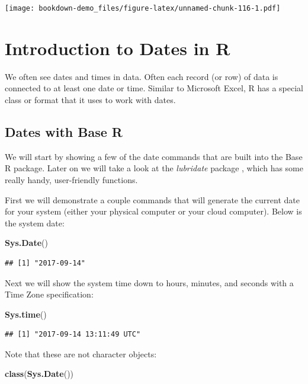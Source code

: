 \documentclass[]{book}
\newenvironment{Shaded}{\begin{snugshade}}{\end{snugshade}}
\newcommand{\KeywordTok}[1]{\textcolor[rgb]{0.13,0.29,0.53}{\textbf{{#1}}}}
\newcommand{\NormalTok}[1]{{#1}}
\begin{document}
\texttt{[image: bookdown-demo\_files/figure-latex/unnamed-chunk-116-1.pdf]}

\chapter{Introduction to Dates in R}\label{introduction-to-dates-in-r}

We often see dates and times in data. Often each record (or row) of data
is connected to at least one date or time. Similar to Microsoft Excel, R
has a special class or format that it uses to work with dates.

\section{Dates with Base R}\label{dates-with-base-r}

We will start by showing a few of the date commands that are built into
the Base R package. Later on we will take a look at the \emph{lubridate}
package \citep{R-lubridate}, which has some really handy, user-friendly
functions.

First we will demonstrate a couple commands that will generate the
current date for your system (either your physical computer or your
cloud computer). Below is the system date:

\begin{Shaded}
\begin{Highlighting}[]
\KeywordTok{Sys.Date}\NormalTok{()}
\end{Highlighting}
\end{Shaded}

\begin{verbatim}
## [1] "2017-09-14"
\end{verbatim}

Next we will show the system time down to hours, minutes, and seconds
with a Time Zone specification:

\begin{Shaded}
\begin{Highlighting}[]
\KeywordTok{Sys.time}\NormalTok{()}
\end{Highlighting}
\end{Shaded}

\begin{verbatim}
## [1] "2017-09-14 13:11:49 UTC"
\end{verbatim}

Note that these are not character objects:

\begin{Shaded}
\begin{Highlighting}[]
\KeywordTok{class}\NormalTok{(}\KeywordTok{Sys.Date}\NormalTok{())}
\end{Highlighting}
\end{Shaded}
\end{document}
